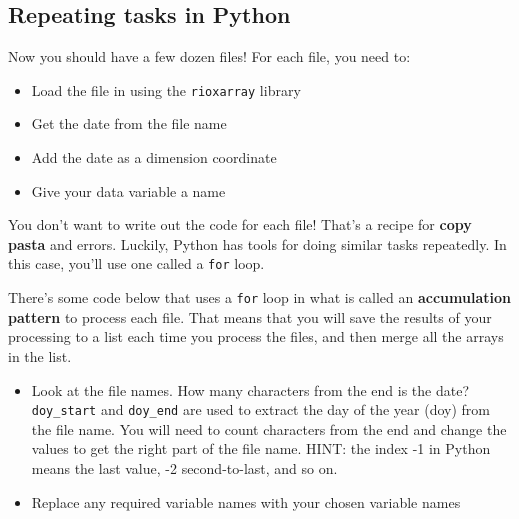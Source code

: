 \documentclass[
  letterpaper,
  DIV=11,
  numbers=noendperiod,
  oneside]{scrreprt}
\providecommand{\tightlist}{%
  \setlength{\itemsep}{0pt}\setlength{\parskip}{0pt}}
\begin{document}
\subsection{Repeating tasks in
Python}\label{repeating-tasks-in-python-1}

Now you should have a few dozen files! For each file, you need to:

\begin{itemize}
\tightlist
\item
  Load the file in using the \texttt{rioxarray} library
\item
  Get the date from the file name
\item
  Add the date as a dimension coordinate
\item
  Give your data variable a name
\end{itemize}

You don't want to write out the code for each file! That's a recipe for
\textbf{copy pasta} and errors. Luckily, Python has tools for doing
similar tasks repeatedly. In this case, you'll use one called a
\texttt{for} loop.

There's some code below that uses a \texttt{for} loop in what is called
an \textbf{accumulation pattern} to process each file. That means that
you will save the results of your processing to a list each time you
process the files, and then merge all the arrays in the list.

\begin{tcolorbox}[enhanced jigsaw, colbacktitle=quarto-callout-color!10!white, opacityback=0, bottomtitle=1mm, toptitle=1mm, bottomrule=.15mm, left=2mm, colframe=quarto-callout-color-frame, leftrule=.75mm, opacitybacktitle=0.6, colback=white, rightrule=.15mm, toprule=.15mm, breakable, titlerule=0mm, title=\textcolor{quarto-callout-color}{\faInfo}\hspace{0.5em}{Try It}, coltitle=black, arc=.35mm]

\begin{itemize}
\tightlist
\item
  Look at the file names. How many characters from the end is the date?
  \texttt{doy\_start} and \texttt{doy\_end} are used to extract the day
  of the year (doy) from the file name. You will need to count
  characters from the end and change the values to get the right part of
  the file name. HINT: the index -1 in Python means the last value, -2
  second-to-last, and so on.
\item
  Replace any required variable names with your chosen variable names
\end{itemize}

\end{tcolorbox}
\end{document}
